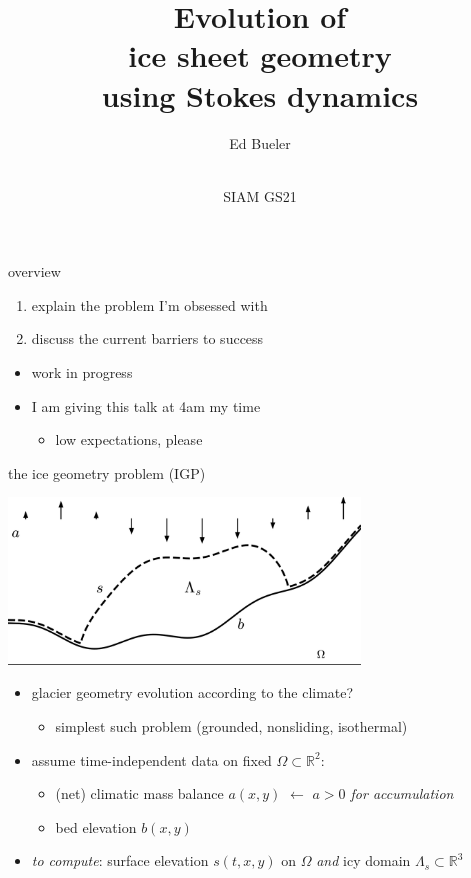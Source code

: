 \documentclass[usepdftitle=false,usenames,dvipsnames]{beamer}
\title{Evolution of \\ ice sheet geometry \\ using Stokes dynamics}
\author{Ed Bueler}
\date{\phantom{foo} \bigskip \bigskip \bigskip \\ SIAM GS21}
\newcommand{\RR}{\mathbb{R}}
\begin{document}
\begin{frame}
	\maketitle
\end{frame}


\begin{frame}{overview}
\Large
\begin{enumerate}
\item explain the problem I'm obsessed with
\item discuss the current barriers to success
\end{enumerate}

\normalsize
\vspace{10mm}
\begin{itemize}
\item<2-3> work in progress
\item<2-3> I am giving this talk at 4am my time
    \begin{itemize}
    \item<3> low expectations, please
    \end{itemize}
\end{itemize}
\end{frame}


\begin{frame}{the ice geometry problem (IGP)}

\vspace{-2mm}
\begin{center}
\includegraphics[width=0.7\textwidth]{figs/stokesdomain.png}
\end{center}

\vspace{-1mm}
\begin{itemize}
\item glacier geometry evolution according to the climate?
    \begin{itemize}
    \item simplest such problem (grounded, nonsliding, isothermal)
    \end{itemize}
\item assume time-independent data on fixed $\Omega \subset \RR^2$:
    \begin{itemize}
    \item (net) climatic mass balance $a(x,y)$ \hfill $\gets$ \emph{$a>0$ for accumulation}
    \item bed elevation $b(x,y)$
    \end{itemize}
\item \emph{to compute}: surface elevation $s(t,x,y)$ on $\Omega$ \emph{and} icy domain $\Lambda_s \subset \RR^3$
\end{itemize}
\end{frame}
\end{document}
